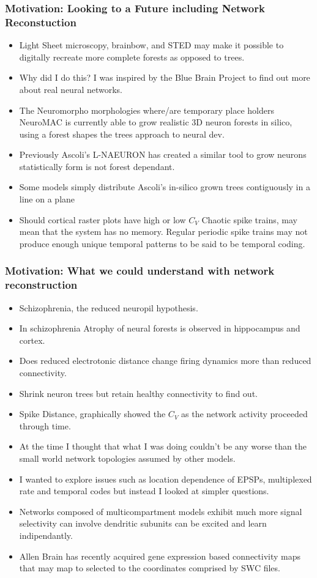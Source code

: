 \documentclass{beamer}
\begin{document}
\begin{frame}
\frametitle{Motivation: Looking to a Future including Network Reconstuction}%
\begin{itemize}

\vfill \item Light Sheet microscopy, brainbow, and STED may make it possible to digitally recreate more complete forests as opposed to trees.
\vfill\item Why did I do this? I was inspired by the Blue Brain Project to find out more about real neural networks.
\vfill\item The Neuromorpho morphologies where/are temporary place holders NeuroMAC is currently able to grow realistic 3D neuron forests in silico, using a forest shapes the trees approach to neural dev.
\vfill\item Previously Ascoli's L-NAEURON has created a similar tool to grow neurons statistically form is not forest dependant.
\vfill\item Some models simply distribute Ascoli's in-silico grown trees contiguously in a line on a plane
\vfill\item Should cortical raster plots have high or low $ C_{V} $ Chaotic spike trains, may mean that the system has no memory. Regular periodic spike trains may not produce enough unique temporal patterns to be said to be temporal coding.
\end{itemize}
\end{frame}
\begin{frame}
\frametitle{Motivation: What we could understand with network reconstruction}%
\begin{itemize}
\vfill\item Schizophrenia, the reduced neuropil hypothesis.
\vfill\item In schizophrenia Atrophy of neural forests is observed in hippocampus and cortex.
\vfill\item Does reduced electrotonic distance change firing dynamics more than reduced connectivity.
\vfill\item Shrink neuron trees but retain healthy connectivity to find out.
\vfill\item Spike Distance, graphically showed the $C_{V}$ as the network activity proceeded through time. 
\vfill\item At the time I thought that what I was doing couldn't be any worse than the small world network topologies assumed by other models.
\vfill\item I wanted to explore issues such as location dependence of EPSPs, multiplexed rate and temporal codes but instead I looked at simpler questions.
\vfill\item Networks composed of multicompartment models exhibit much more signal selectivity can involve dendritic subunits can be excited and learn indipendantly.
\vfill\item Allen Brain has recently acquired gene expression based connectivity maps that may map to selected to the coordinates comprised by SWC files.
\end{itemize}
\end{frame}
\end{document}
